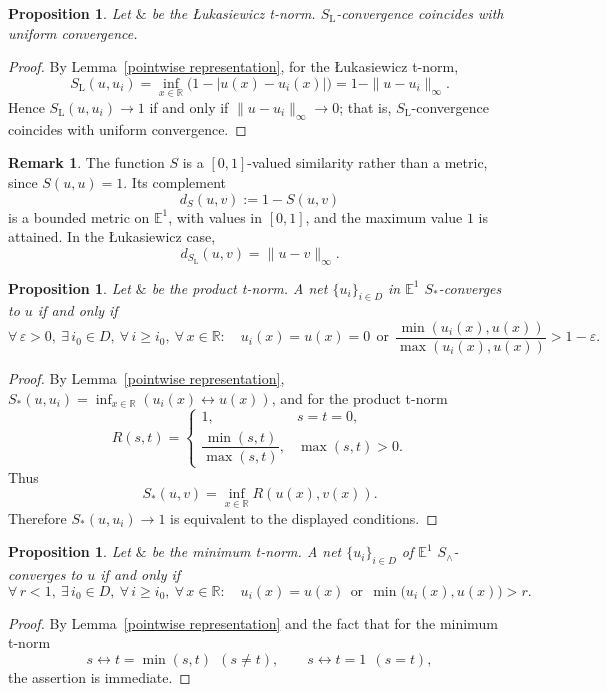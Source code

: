 \documentclass[preprint,3p,times]{elsarticle}
\theoremstyle{plain}
\newtheorem{prop}[thm]{Proposition}
\theoremstyle{definition}
\newtheorem{remark}[thm]{Remark}
\newcommand{\Luk}{\mathrm{L}}
\numberwithin{equation}{section}
\begin{document}
\begin{prop}\label{Lukasiewicz t-norm in E^1}
    Let \(\&\) be the {\L}ukasiewicz t-norm. \(S_{\Luk}\)-convergence coincides with uniform convergence.
\end{prop}
\begin{proof}
By Lemma~\ref{pointwise representation}, for the {\L}ukasiewicz t-norm,
\[
S_{\Luk}(u,u_i)=\inf_{x\in\mathbb{R}}\bigl(1-|u(x)-u_i(x)|\bigr)=1-\|u-u_i\|_\infty.
\]
Hence $S_{\Luk}(u,u_i)\to1$ if and only if $\|u-u_i\|_\infty\to0$; that is, $S_{\Luk}$-convergence coincides with uniform convergence. 
\end{proof}
\begin{remark}
  The function \(S\) is a \([0,1]\)-valued similarity rather than a metric,
since \(S(u,u)=1\). Its complement
\[
d_S(u,v):=1-S(u,v)
\]
is a bounded metric on \(\mathbb{E}^1\), with values in \([0,1]\), and the
maximum value \(1\) is attained. In the {\L}ukasiewicz case,
\[
d_{S_{\Luk}}(u,v)=\|u-v\|_\infty.
\]
\end{remark}
\begin{prop}\label{product norm in E^1}
   Let \(\&\) be the product t-norm. A net \(\{u_i\}_{i\in D}\) in \(\mathbb{E}^1\) \(S_{*}\)-converges to \(u\) if and only if
   \[
   \forall\,\varepsilon>0,\ \exists\,i_0\in D,\ \forall\,i\ge i_0,\ \forall\,x\in\mathbb{R}:\quad
   u_i(x)=u(x)=0\ \ \text{or}\ \ \frac{\min(u_i(x),u(x))}{\max(u_i(x),u(x))}>1-\varepsilon .
   \]
\end{prop}
\begin{proof}
By Lemma~\ref{pointwise representation}, \(S_{*}(u,u_i)=\inf_{x\in\mathbb{R}}(u_i(x)\leftrightarrow u(x))\), and for the product t-norm
\[
R(s,t)=
\begin{cases}
1, & s=t=0,\\[2pt]
\dfrac{\min(s,t)}{\max(s,t)}, & \max(s,t)>0.
\end{cases}
\]
Thus
\[
S_*(u,v)=\inf_{x\in\mathbb R}R(u(x),v(x)).
\]
Therefore \(S_{*}(u,u_i)\to1\) is equivalent to the displayed conditions.
\end{proof}

\begin{prop}\label{minimum t-norm in E^1}
   Let \(\&\) be the minimum t-norm. A net \(\{u_i\}_{i\in D}\) of \(\mathbb{E}^1\) \(S_{\wedge}\)-converges to \(u\) if and only if
   \[
   \forall\,r<1,\ \exists\,i_0\in D,\ \forall\,i\ge i_0,\ \forall\,x\in\mathbb{R}:\quad
   u_i(x)=u(x)\ \ \text{or}\ \ \min\bigl(u_i(x),u(x)\bigr)>r .
   \]
\end{prop}
\begin{proof}
By Lemma~\ref{pointwise representation} and the fact that for the minimum t-norm
\[
s\leftrightarrow t=\min(s,t)\ \ (s\ne t),\qquad s\leftrightarrow t=1\ \ (s=t),
\]
the assertion is immediate.
\end{proof}
\end{document}
